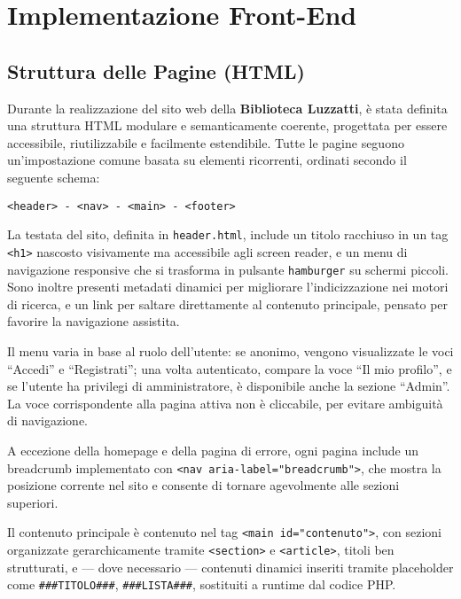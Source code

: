 \documentclass{article}
\begin{document}
\newpage

\section{Implementazione Front-End}

\subsection{Struttura delle Pagine (HTML)}

Durante la realizzazione del sito web della \textbf{Biblioteca Luzzatti}, è stata definita una struttura HTML modulare e semanticamente coerente, progettata per essere accessibile, riutilizzabile e facilmente estendibile.  
Tutte le pagine seguono un’impostazione comune basata su elementi ricorrenti, ordinati secondo il seguente schema:

\begin{center}
\texttt{\textless header\textgreater{} - \textless nav\textgreater{} - \textless main\textgreater{} - \textless footer\textgreater{}}
\end{center}

La testata del sito, definita in \texttt{header.html}, include un titolo racchiuso in un tag \texttt{<h1>} nascosto visivamente ma accessibile agli screen reader, e un menu di navigazione responsive che si trasforma in pulsante \texttt{hamburger} su schermi piccoli.  
Sono inoltre presenti metadati dinamici per migliorare l’indicizzazione nei motori di ricerca, e un link per saltare direttamente al contenuto principale, pensato per favorire la navigazione assistita.

Il menu varia in base al ruolo dell’utente: se anonimo, vengono visualizzate le voci “Accedi” e “Registrati”; una volta autenticato, compare la voce “Il mio profilo”, e se l’utente ha privilegi di amministratore, è disponibile anche la sezione “Admin”. La voce corrispondente alla pagina attiva non è cliccabile, per evitare ambiguità di navigazione.

A eccezione della homepage e della pagina di errore, ogni pagina include un breadcrumb implementato con \texttt{<nav aria-label="breadcrumb">}, che mostra la posizione corrente nel sito e consente di tornare agevolmente alle sezioni superiori.

Il contenuto principale è contenuto nel tag \texttt{<main id="contenuto">}, con sezioni organizzate gerarchicamente tramite \texttt{<section>} e \texttt{<article>}, titoli ben strutturati, e — dove necessario — contenuti dinamici inseriti tramite placeholder come \texttt{\#\#\#TITOLO\#\#\#}, \texttt{\#\#\#LISTA\#\#\#}, sostituiti a runtime dal codice PHP.
\end{document}
